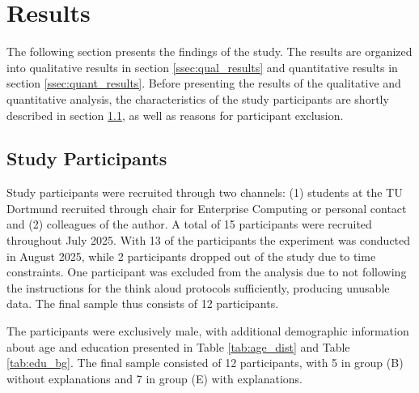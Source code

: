 \section{Results} \label{sec:results}

The following section presents the findings of the study. The results are organized into qualitative results in section \ref{ssec:qual_results} and quantitative results in section \ref{ssec:quant_results}. Before presenting the results of the qualitative and quantitative analysis, the characteristics of the study participants are shortly described in section \ref{ssec:study_participants}, as well as reasons for participant exclusion.

\subsection{Study Participants} \label{ssec:study_participants}


Study participants were recruited through two channels: (1) students at the TU Dortmund recruited through chair for Enterprise Computing or personal contact and (2) colleagues of the author. A total of 15 participants were recruited throughout July 2025. With 13 of the participants the experiment was conducted in August 2025, while 2 participants dropped out of the study due to time constraints. One participant was excluded from the analysis due to not following the instructions for the think aloud protocols sufficiently, producing unusable data. The final sample thus consists of 12 participants.


The participants were exclusively male, with additional demographic information about age and education presented in Table \ref{tab:age_dist} and Table \ref{tab:edu_bg}. The final sample consisted of 12 participants, with 5 in group (B) without explanations and 7 in group (E) with explanations.

\begingroup
\tablespacing

